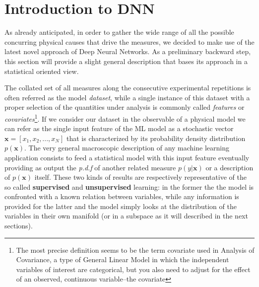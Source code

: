 \section{Introduction to DNN}

As already anticipated, in order to gather the wide range of all the possible concurring physical causes that drive the measures, we decided to make use of the latest novel approach of Deep Neural Networks. As a preliminary backward step, this section will provide a slight general description that bases its approach in a statistical oriented view.

The collated set of all measures along the consecutive experimental repetitions is often referred as the model \textit{dataset}, while a single instance of this dataset with a proper selection of the quantities under analysis is commonly called \textit{features} or \textit{covariates}\footnote{The most precise definition seems to be the term covariate used in Analysis of Covariance, a type of General Linear Model in which the independent variables of interest are categorical, but you also need to adjust for the effect of an observed, continuous variable–the covariate}.
%
If we consider our dataset in the observable of a physical model we can refer as the single input feature of the ML model as a stochastic vector $\bm{x} = [x_1,x_2, ... ,x_N]$ that is characterized by its probability density distribution $p(\bm{x})$. The very general macroscopic description of any machine learning application consists to feed a statistical model with this input feature eventually providing as output the \textit{p.d.f} of another related measure $p(y|\bm{x})$ or a description of $p(\bm{x})$ itself. These two kinds of results are respectively representative of the so called  \textbf{supervised} and \textbf{unsupervised} learning: in the former the the model is confronted with a known relation between variables, while any information is provided for the latter and the model simply looks at the distribution of the variables in their own manifold (or in a subspace as it will described in the next sections).

